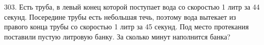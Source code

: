 303. Есть труба, в левый конец которой поступает вода со скоростью 1 литр за 44 секунд. Посередине трубы есть небольшая течь, поэтому вода вытекает из правого конца трубы со скоростью 1 литр за 45 секунд. Под место протекания поставили пустую литровую банку. За сколько минут наполнится банка?\\
